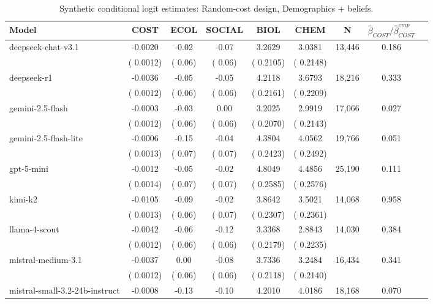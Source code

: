 \begin{table}[h]
\centering
\caption{Synthetic conditional logit estimates: Random-cost design, Demographics + beliefs.}
\label{tab:syn-clogit-repeated-withBeliefs}
\begin{threeparttable}
\footnotesize
\begin{tabular}{lcccccccr}
\toprule
Model & COST & ECOL & SOCIAL & BIOL & CHEM & N & $\hat\beta_{COST}/\hat\beta_{COST}^{emp}$ \\
\midrule
deepseek-chat-v3.1 &   -0.0020 &     -0.02 &     -0.07 &    3.2629 &    3.0381 &    13,446 &  0.186 \\
 & (   0.0012) & (     0.06) & (     0.06) & (   0.2105) & (   0.2148) & & \\
deepseek-r1 &   -0.0036 &     -0.05 &     -0.05 &    4.2118 &    3.6793 &    18,216 &  0.333 \\
 & (   0.0012) & (     0.06) & (     0.06) & (   0.2161) & (   0.2209) & & \\
gemini-2.5-flash &   -0.0003 &     -0.03 &      0.00 &    3.2025 &    2.9919 &    17,066 &  0.027 \\
 & (   0.0012) & (     0.06) & (     0.06) & (   0.2070) & (   0.2143) & & \\
gemini-2.5-flash-lite &   -0.0006 &     -0.15 &     -0.04 &    4.3804 &    4.0562 &    19,766 &  0.051 \\
 & (   0.0013) & (     0.07) & (     0.07) & (   0.2423) & (   0.2492) & & \\
gpt-5-mini &   -0.0012 &     -0.05 &     -0.02 &    4.8049 &    4.4856 &    25,190 &  0.111 \\
 & (   0.0014) & (     0.07) & (     0.07) & (   0.2585) & (   0.2576) & & \\
kimi-k2 &   -0.0105 &     -0.09 &     -0.02 &    3.8642 &    3.5021 &    14,068 &  0.958 \\
 & (   0.0013) & (     0.06) & (     0.07) & (   0.2307) & (   0.2361) & & \\
llama-4-scout &   -0.0042 &     -0.06 &     -0.12 &    3.3368 &    2.8843 &    14,030 &  0.384 \\
 & (   0.0012) & (     0.06) & (     0.06) & (   0.2179) & (   0.2235) & & \\
mistral-medium-3.1 &   -0.0037 &      0.00 &     -0.08 &    3.7336 &    3.2484 &    16,434 &  0.341 \\
 & (   0.0012) & (     0.06) & (     0.06) & (   0.2118) & (   0.2140) & & \\
mistral-small-3.2-24b-instruct &   -0.0008 &     -0.13 &     -0.10 &    4.2010 &    4.0186 &    18,168 &  0.070 \\

\end{tabular}
\end{threeparttable}
\end{table}
